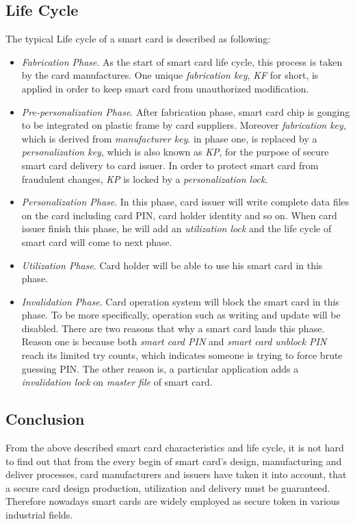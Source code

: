 \subsection{Life Cycle}
The typical Life cycle of a smart card is described as following\cite{smart_card_contactless}:
\begin{itemize}
\item \emph{Fabrication Phase}. As the start of smart card life cycle, this process is taken by the card manufactures. One unique \emph{fabrication key}, \emph{KF} for short, is applied in order to keep smart card from unauthorized modification. 
\item \emph{Pre-personalization Phase}. After fabrication phase,  smart card chip is gonging to be integrated on plastic frame by card suppliers. Moreover \emph{fabrication key}, which is derived from \emph{manufacturer key}. in phase one, is replaced by a \emph{personalization key}, which is also known as \emph{KP},  for the purpose of secure smart card delivery to card issuer. In order to protect smart card from fraudulent changes, \emph{KP} is locked by a \emph{personalization lock}.
\item \emph{Personalization Phase}. In this phase,  card issuer will write complete data files on the card including card PIN, card holder identity and so on. When card issuer finish this phase, he will add an \emph{utilization lock} and the life cycle of smart card will come to next phase.
\item \emph{Utilization Phase}. Card holder will be able to use his smart card in this phase. 
\item \emph{Invalidation Phase}. Card operation system will block the smart card in this phase. To be more specifically, operation such as writing and update will be disabled. There are two reasons that why a smart card lands this phase. Reason one is because both \emph{smart card PIN} and \emph{smart card unblock PIN} reach its limited  try counts, which indicates someone is trying to force brute guessing PIN.  The other reason is, a particular application adds a \emph{invalidation lock} on \emph{master file} of smart card.
\end{itemize}

\subsection {Conclusion}
From the above described smart card characteristics and life cycle, it is not hard to find out that from the every begin of smart card's design, manufacturing and deliver processes, card manufacturers and issuers have taken it into account, that a secure card design production, utilization and delivery must be guaranteed. Therefore nowadays smart cards are widely employed as secure token in various industrial fields.


